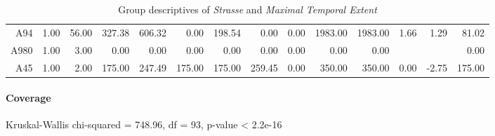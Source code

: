 \begin{table}[ht!]
\begin{tabular}{rrrrrrrrrrrrrr}
    A94  & 1.00 & 56.00 & 327.38 & 606.32 & 0.00 & 198.54 & 0.00 & 0.00 & 1983.00 & 1983.00 & 1.66 & 1.29 & 81.02 \\ 
    A980 & 1.00 & 3.00 & 0.00 & 0.00 & 0.00 & 0.00 & 0.00 & 0.00 & 0.00 & 0.00 &  &  & 0.00 \\ 
    A45  & 1.00 & 2.00 & 175.00 & 247.49 & 175.00 & 175.00 & 259.45 & 0.00 & 350.00 & 350.00 & 0.00 & -2.75 & 175.00 \\ 
    \hline
  \end{tabular}
	\caption{Group descriptives of \textit{Strasse} and \textit{Maximal Temporal Extent}}
	\label{tbl:descriptives_baysis_matched_Strasse_TMax}
\end{table}

\paragraph{Coverage}
Kruskal-Wallis chi-squared = 748.96, df = 93, p-value < 2.2e-16

